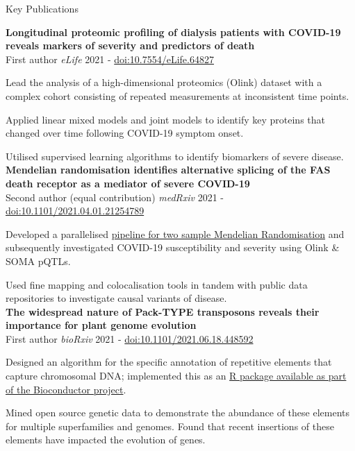 \documentclass{resume}
\begin{document}
\begin{rSection}{Key Publications}

\vspace{1pt plus 1pt}
\textbf{Longitudinal proteomic profiling of dialysis patients with COVID-19 reveals markers of severity and predictors of death} \\
First author \hfill  \textit{eLife} 2021 - \href{https://doi.org/10.7554/eLife.64827}{doi:10.7554/eLife.64827}

\vspace{2pt plus 1pt minus 1pt}
\item Lead the analysis of a high-dimensional proteomics (Olink) dataset with a complex cohort consisting of repeated measurements at inconsistent time points.
\item Applied linear mixed models and joint models to identify key proteins that changed over time following COVID-19 symptom onset.
\item Utilised supervised learning algorithms to identify biomarkers of severe disease.\\

\textbf{Mendelian randomisation identifies alternative splicing of the FAS death receptor as a mediator of severe COVID-19} \\
Second author (equal contribution) \hfill  \textit{medRxiv} 2021 - \href{https://doi.org/10.1101/2021.04.01.21254789}{doi:10.1101/2021.04.01.21254789}

\vspace{2pt plus 1pt minus 1pt}
\item Developed a parallelised \href{https://github.com/jackgisby/mr-nextflow}{pipeline for two sample Mendelian Randomisation} and subsequently investigated COVID-19 susceptibility and severity using Olink \& SOMA pQTLs. 
\item Used fine mapping and colocalisation tools in tandem with public data repositories to investigate causal variants of disease. \\

\textbf{The widespread nature of Pack-TYPE transposons reveals their importance for plant genome evolution} \\
First author \hfill  \textit{bioRxiv} 2021 - \href{https://doi.org/10.1101/2021.06.18.448592}{doi:10.1101/2021.06.18.448592}

\vspace{2pt plus 1pt minus 1pt}
\item Designed an algorithm for the specific annotation of repetitive elements that capture chromosomal DNA; implemented this as an \href{https://bioconductor.org/packages/release/bioc/html/packFinder.html}{R package available as part of the Bioconductor project}.
\item Mined open source genetic data to demonstrate the abundance of these elements for multiple superfamilies and genomes. Found that recent insertions of these elements have impacted the evolution of genes. \\


\end{rSection}
\end{document}

